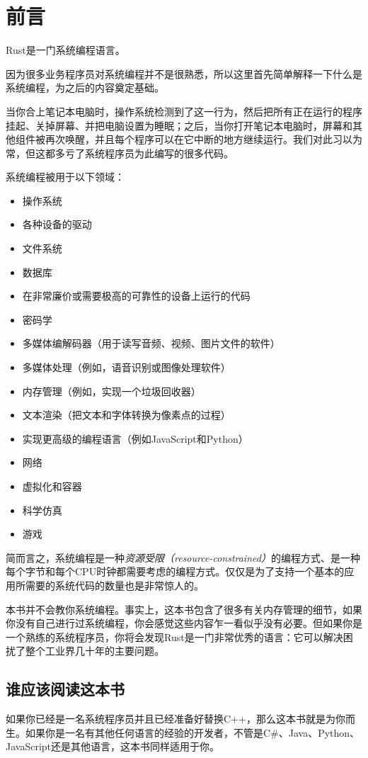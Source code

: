 \chapter{前言}
Rust是一门系统编程语言。

因为很多业务程序员对系统编程并不是很熟悉，所以这里首先简单解释一下什么是系统编程，为之后的内容奠定基础。

当你合上笔记本电脑时，操作系统检测到了这一行为，然后把所有正在运行的程序挂起、关掉屏幕、并把电脑设置为睡眠；之后，当你打开笔记本电脑时，屏幕和其他组件被再次唤醒，并且每个程序可以在它中断的地方继续运行。我们对此习以为常，但这都多亏了系统程序员为此编写的很多代码。

系统编程被用于以下领域：
\begin{itemize}
    \item 操作系统
    \item 各种设备的驱动
    \item 文件系统
    \item 数据库
    \item 在非常廉价或需要极高的可靠性的设备上运行的代码
    \item 密码学
    \item 多媒体编解码器（用于读写音频、视频、图片文件的软件）
    \item 多媒体处理（例如，语音识别或图像处理软件）
    \item 内存管理（例如，实现一个垃圾回收器）
    \item 文本渲染（把文本和字体转换为像素点的过程）
    \item 实现更高级的编程语言（例如JavaScript和Python）
    \item 网络
    \item 虚拟化和容器
    \item 科学仿真
    \item 游戏
\end{itemize}

简而言之，系统编程是一种\emph{资源受限（resource-constrained）}的编程方式、是一种每个字节和每个CPU时钟都需要考虑的编程方式。仅仅是为了支持一个基本的应用所需要的系统代码的数量也是非常惊人的。

本书并不会教你系统编程。事实上，这本书包含了很多有关内存管理的细节，如果你没有自己进行过系统编程，你会感觉这些内容乍一看似乎没有必要。但如果你是一个熟练的系统程序员，你将会发现Rust是一门非常优秀的语言：它可以解决困扰了整个工业界几十年的主要问题。

\section*{谁应该阅读这本书}
如果你已经是一名系统程序员并且已经准备好替换C++，那么这本书就是为你而生。如果你是一名有其他任何语言的经验的开发者，不管是C\#、Java、Python、JavaScript还是其他语言，这本书同样适用于你。

